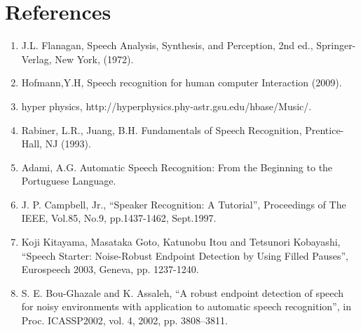 \documentclass[12pt, a4paper, twoside]{report}
\begin{document}
\section*{References}
\begin{enumerate}[label=(\arabic*), noitemsep]
\item J.L. Flanagan, Speech Analysis, Synthesis, and Perception, 2nd ed., Springer-Verlag, New York, (1972).
\item Hofmann,Y.H, Speech recognition for human computer Interaction (2009).
\item hyper physics, http://hyperphysics.phy-astr.gsu.edu/hbase/Music/.
\item Rabiner, L.R., Juang, B.H. Fundamentals of Speech Recognition, Prentice-Hall, NJ (1993).
\item Adami, A.G. Automatic Speech Recognition: From the Beginning to the Portuguese Language.
\item J. P. Campbell, Jr., “Speaker Recognition: A Tutorial”, Proceedings of The IEEE, Vol.85, No.9, pp.1437-1462, Sept.1997. 
\item Koji Kitayama, Masataka Goto, Katunobu Itou and Tetsunori Kobayashi, “Speech Starter: Noise-Robust Endpoint Detection by Using Filled Pauses”, Eurospeech 2003, Geneva, pp. 1237-1240. 
\item S. E. Bou-Ghazale and K. Assaleh, “A robust endpoint detection of speech for noisy environments with application to automatic speech recognition”, in Proc. ICASSP2002, vol. 4, 2002, pp. 3808–3811.
\end{enumerate}
\end{document}
